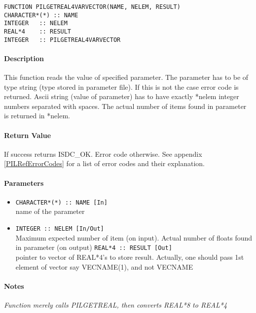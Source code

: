 \begin{verbatim}
FUNCTION PILGETREAL4VARVECTOR(NAME, NELEM, RESULT) 
CHARACTER*(*) :: NAME 
INTEGER   :: NELEM
REAL*4    :: RESULT 
INTEGER   :: PILGETREAL4VARVECTOR
\end{verbatim}

\paragraph{Description\\}
This function reads the value of specified parameter. The parameter has
to be of type string (type stored in parameter file). If this is not the
case error code is returned. Ascii string (value of parameter) has to have
exactly *nelem integer numbers separated with spaces. The actual number
of items found in parameter is returned in *nelem.

\paragraph{Return Value\\}
If success returns ISDC\_OK. Error code otherwise. See appendix \ref{PILRefErrorCodes}
for a list of error codes and their explanation.

\paragraph{Parameters}
\begin{itemize}
\item
{\tt CHARACTER*(*) :: NAME [In] } \\
name of the parameter 
\item
{\tt INTEGER   :: NELEM [In/Out] } \\
Maximum expected number of item (on input). Actual number of floats found in
parameter (on output)
{\tt REAL*4 :: RESULT [Out] } \\
pointer to vector of REAL*4's to store result. Actually, one should
pass 1st element of vector say VECNAME(1), and not VECNAME
\end{itemize}

\paragraph{Notes\\}
{\it
Function merely calls PILGETREAL, then converts REAL*8 to REAL*4
}



